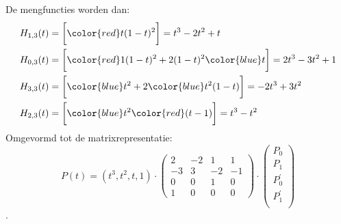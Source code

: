 \begin{itemize}
{\begin{itemize}
				De mengfuncties worden dan:
				\begin{equation*}
					\begin{split}
						H_{1, 3}(t)  & = \bigg[{\color{red}t}(1-t)^2\bigg] = t^3 -2t^2 + t \\
						H_{0, 3}(t)  & = \bigg[{\color{red}1}(1-t)^2 + 2(1-t)^2{\color{blue}t}\bigg]= 2t^3 - 3t^2 + 1\\
						H_{3, 3}(t)  & = \bigg[{\color{blue}t^2} + 2{\color{blue}t^2}(1-t)\bigg] = -2t^3 + 3t^2\\
						H_{2, 3}(t)  & = \bigg[{\color{blue}t^2}{\color{red}(t-1)}\bigg] = t^3 - t^2
					\end{split}
				\end{equation*}
				Omgevormd tot de matrixrepresentatie:
				$$
				P(t) = (t^3, t^2, t, 1) 
				\cdot
				\begin{pmatrix}
					2 & -2 & 1 & 1 \\
					-3 & 3 & -2 & -1 \\
					0 & 0 & 1 & 0 \\
					1 & 0 & 0 & 0
				\end{pmatrix}
				\cdot 
				\begin{pmatrix}
					P_0 \\
					P_1 \\
					P_0^{'} \\
					P_1^{'} \\
				\end{pmatrix}
				$$
				.
		
		\end{itemize}}



			
\end{itemize}